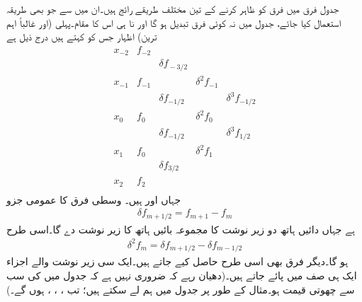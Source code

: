 جدول فرق میں فرق کو ظاہر کرنے  کے تین مختلف  طریقے رائج ہیں۔ان میں سے جو بھی طریقہ استعمال کیا جائے، جدول میں نہ کوئی فرق تبدیل ہو گا اور نا ہی اس کا مقام۔پہلی (اور غالباً اہم ترین) اظہار  جس کو  کہتے ہیں درج ذیل ہے
\begin{equation*}
\begin{array}{lllll}
x_{-2}&f_{-2}&&&\\
&&\delta f_{\!-3/2}&&\\
x_{-1}&f_{-1}&&\delta^2f_{-1}&\\
&&\delta f_{-1/2}&&\delta^3f_{-1/2}\\
x_0&f_0&&\delta^2f_{0}&\\
&&\delta f_{-1/2}&&\delta^3f_{1/2}\\
x_1&f_0&&\delta^2f_{1}&\\
&&\delta f_{3/2}&&\\
x_2&f_2&&&\\
&&&&
\end{array}
\end{equation*}
جہاں  اور  ہیں۔ وسطی فرق کا  عمومی جزو
\begin{align}
\delta f_{m+1/2}=f_{m+1}-f_m
\end{align}
ہے جہاں دائیں ہاتھ دو زیر نوشت کا مجموعہ  بائیں ہاتھ کا زیر نوشت دے گا۔اسی طرح
\begin{align*}
\delta^2 f_{m}=\delta f_{m+1/2}-\delta f_{m-1/2}
\end{align*}
ہو گا۔دیگر فرق بھی اسی طرح حاصل کیے جاتے ہیں۔ایک سی زیر نوشت والے اجزاء ایک ہی صف میں پائے جاتے ہیں۔(دھیان رہے کہ ضروری نہیں ہے کہ جدول میں  کی سب سے چھوتی قیمت  ہو۔مثال کے طور پر جدول  میں ہم  لے سکتے ہیں؛ تب ، ، ،  ہوں گے۔)

